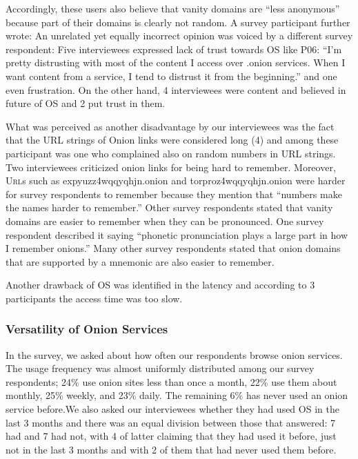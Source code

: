Accordingly, these users also believe that vanity domains  are ``less anonymous''
because part of their domains is clearly not random.  A survey participant
further wrote:   An unrelated yet
equally incorrect opinion was voiced by a different survey respondent:
 Five interviewees expressed lack of trust towards OS like P06: “I'm pretty distrusting with most of the content I access over .onion services. When I want content from a service, I tend to distrust it from the beginning.” and one even frustration. On the other hand, 4 interviewees were content and believed in future of OS and 2 put trust in them.

What was perceived as another disadvantage by our interviewees was the fact that the URL strings of Onion links were considered long (4) and among these participant was one who complained also on random numbers in URL strings. Two interviewees criticized onion links for being hard to remember. Moreover, \textsc{Url}s such as expyuzz4wqqyqhjn.onion and torproz4wqqyqhjn.onion were
harder for survey respondents to remember because they mention that ``numbers make the
names harder to remember.''  Other survey respondents stated that vanity domains are easier to
remember when they can be pronounced.  One survey respondent described it saying 
``phonetic pronunciation plays a large part in how I remember onions.'' Many
other survey  respondents stated that onion domains that are supported by a mnemonic are
also easier to remember.  
 
 Another drawback of OS was identified in the latency and according to 3 participants the access time was too slow. 

\subsubsection{ Versatility of Onion Services }
In the survey, we asked about how often our respondents browse onion
services.  The usage frequency was almost uniformly distributed among our survey
respondents; 24\% use onion sites less than once a month, 22\% use them about
monthly, 25\% weekly, and 23\% daily.  The remaining 6\% has never used an onion
service before.We also asked our interviewees whether they had used OS in the last 3 months and there was an equal division between those that answered: 7 had and 7 had not, with 4 of latter claiming that they had used it before, just not in the last 3 months and with 2 of them that had never used them before.

